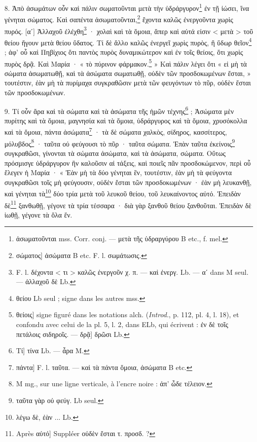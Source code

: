\documentclass[landscape, a4paper, 11pt, oneside, polutonikogreek, french]{article}
\begin{document}
8. Ἀπὸ ἀσωμάτων οὖν καὶ πάλιν σωματοῦνται μετὰ τὴν ὑδράργυρον\footnote{ἀσωματοῦνται mss. Corr. conj. --- μετὰ τῆς ὑδραργύρου B etc., f. mel.} ἐν τῇ ἰώσει, ἵνα γένηται σώματος. Καὶ σαπέντα ἀσωματοῦνται,\footnote{σώματος] ἀσώματα B etc. F. l. σωμάτωσις.} ἔχοντα καλῶς ἐνεργοῦντα χωρὶς πυρός. [αʹ] Ἀλλαχοῦ ἐλέχθη\footnote{F. l. δέχοντα < τι > καλῶς ἐνεργοῦν χ. π. --- καὶ ἐνεργ. Lb. --- αʹ dans M seul. --- ἀλλαχοῦ δὲ Lb.} · χολαὶ καὶ τὰ ὅμοια, ἅπερ καὶ αὐτά εἰσιν < μετὰ > τοῦ θείου ἤγουν μετὰ θείου ὕδατος. Τί δὲ ἄλλο καλῶς ἐνεργεῖ χωρὶς πυρὸς, ἢ ὕδωρ θεῖον\footnote{θείου Lb seul ; signe dans les autres mss.} ; ἀφ' οὗ καὶ Πηβίχιος ὅτι παντὸς πυρὸς δυναμικώτερον καὶ ἐν τοῖς θείοις, ὅτι χωρὶς πυρὸς δρᾷ. Καὶ Μαρία · « τὸ πύρινον φάρμακον.\footnote{θείοις] signe figuré dans les notations alch. (\emph{Introd.}, p. 112, pl. 4, l. 18), et confondu avec celui de la pl. 5, l. 2, dans ELb, qui écrivent : ἐν δὲ τοῖς πετάλοις σιδηροῖς. --- δρᾷ] δρῶσι Lb.} » Καὶ πάλιν λέγει ὅτι « εἰ μὴ τὰ σώματα ἀσωματωθῇ, καὶ τὰ ἀσώματα σωματωθῇ, οὐδὲν τῶν προσδοκωμένων ἔσται, » τουτέστιν, ἐὰν μὴ τὰ πυρίμαχα συγκραθῶσιν μετὰ τῶν φευγόντων τὸ πῦρ, οὐδὲν ἔσται τῶν προσδοκωμένων.

9. Τί οὖν ἄρα καὶ τὰ σώματα καὶ τὰ ἀσώματα τῆς ἡμῶν τέχνης\footnote{Τί] τίνα Lb. --- ἆρα M.} ; Ἀσώματα μὲν πυρίτης καὶ τὰ ὅμοια, μαγνησία καὶ τὰ ὅμοια, ὑδράργυρος καὶ τὰ ὅμοια, χρυσόκολλα καὶ τὰ ὅμοια, πάντα ἀσώματα\footnote{πάντα] F. l. ταῦτα. --- καὶ τὰ πάντα ὅμοια, ἀσώματα B etc.} · τὰ δὲ σώματα χαλκὸς, σίδηρος, κασσίτερος, μόλυβδος\footnote{M mg., sur une ligne verticale, à l'encre noire : ἀπ' ὦδε τέλειον.} · ταῦτα οὐ φεύγουσι τὸ πῦρ · ταῦτα σώματα. Ἐπὰν ταῦτα ἐκείνοις\footnote{ταῦτα γὰρ οὐ φεύγ. Lb seul.} συγκραθῶσι, γίνονται τὰ σώματα ἀσώματα, καὶ τὰ ἀσώματα, σώματα. Οὕτως πρόσμισγε ὑδράργυρον ἣν καλοῦσιν αἱ τάξεις, καὶ ποιεῖς πᾶν προσδοκώμενον, περὶ οὗ ἔλεγεν ἡ Μαρία · « Ἐὰν μὴ τὰ δύο γένηται ἓν, τουτέστιν, ἐὰν μὴ τὰ φεύγοντα συγκραθῶσι τοῖς μὴ φεύγουσιν, οὐδὲν ἔσται τῶν προσδοκωμένων · ἐὰν μὴ λευκανθῇ, καὶ γένηται τὰ\footnote{λέγω δὲ, ἐὰν ... Lb.} δύο τρία μετὰ τοῦ λευκοῦ θείου, τοῦ λευκαίνοντος αὐτό. Ἐπειδὰν δὲ\footnote{Après αὐτό] Suppléer οὐδὲν ἔσται τ. προσδ. ?} ξανθωθῇ, γέγονε τὰ τρία τέσσαρα · διὰ γὰρ ξανθοῦ θείου ξανθοῦται. Ἐπειδὰν δὲ ἰωθῇ, γέγονε τὰ ὅλα ἕν.
\end{document}
